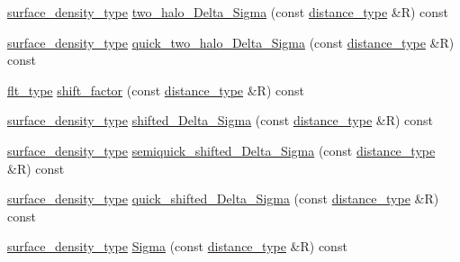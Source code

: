 \begin{DoxyCompactItemize}
\item 
\hyperlink{namespaceIceBRG_a80c597ef5ba0a32491d32a9f0083b02d}{surface\-\_\-density\-\_\-type} \hyperlink{classIceBRG_1_1lensing__profile__extension_a43b6010d594f6462480b8e8c58d5234e}{two\-\_\-halo\-\_\-\-Delta\-\_\-\-Sigma} (const \hyperlink{namespaceIceBRG_a45499647eb87e24c10ab32c628711cec}{distance\-\_\-type} \&R) const 
\item 
\hyperlink{namespaceIceBRG_a80c597ef5ba0a32491d32a9f0083b02d}{surface\-\_\-density\-\_\-type} \hyperlink{classIceBRG_1_1lensing__profile__extension_a895df13fa395114d05376c89cf60f61f}{quick\-\_\-two\-\_\-halo\-\_\-\-Delta\-\_\-\-Sigma} (const \hyperlink{namespaceIceBRG_a45499647eb87e24c10ab32c628711cec}{distance\-\_\-type} \&R) const 
\item 
\hyperlink{lib_2IceBRG__main_2common_8h_ad0f130a56eeb944d9ef2692ee881ecc4}{flt\-\_\-type} \hyperlink{classIceBRG_1_1lensing__profile__extension_a63a6825b6bd340976734cc6b89a4752a}{shift\-\_\-factor} (const \hyperlink{namespaceIceBRG_a45499647eb87e24c10ab32c628711cec}{distance\-\_\-type} \&R) const 
\item 
\hyperlink{namespaceIceBRG_a80c597ef5ba0a32491d32a9f0083b02d}{surface\-\_\-density\-\_\-type} \hyperlink{classIceBRG_1_1lensing__profile__extension_a1542f499631c589f28973b78eff4d322}{shifted\-\_\-\-Delta\-\_\-\-Sigma} (const \hyperlink{namespaceIceBRG_a45499647eb87e24c10ab32c628711cec}{distance\-\_\-type} \&R) const 
\item 
\hyperlink{namespaceIceBRG_a80c597ef5ba0a32491d32a9f0083b02d}{surface\-\_\-density\-\_\-type} \hyperlink{classIceBRG_1_1lensing__profile__extension_a444e4cc3923b1d0daa38bc07afcaf17e}{semiquick\-\_\-shifted\-\_\-\-Delta\-\_\-\-Sigma} (const \hyperlink{namespaceIceBRG_a45499647eb87e24c10ab32c628711cec}{distance\-\_\-type} \&R) const 
\item 
\hyperlink{namespaceIceBRG_a80c597ef5ba0a32491d32a9f0083b02d}{surface\-\_\-density\-\_\-type} \hyperlink{classIceBRG_1_1lensing__profile__extension_a76221dfb28d6c796f22e8b33a1fa3076}{quick\-\_\-shifted\-\_\-\-Delta\-\_\-\-Sigma} (const \hyperlink{namespaceIceBRG_a45499647eb87e24c10ab32c628711cec}{distance\-\_\-type} \&R) const 
\item 
\hyperlink{namespaceIceBRG_a80c597ef5ba0a32491d32a9f0083b02d}{surface\-\_\-density\-\_\-type} \hyperlink{classIceBRG_1_1lensing__profile__extension_a487fb1100188df2406f850327621560f}{Sigma} (const \hyperlink{namespaceIceBRG_a45499647eb87e24c10ab32c628711cec}{distance\-\_\-type} \&R) const 
\item 

\end{DoxyCompactItemize}
